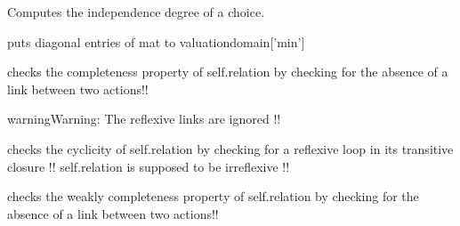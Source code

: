 \documentclass[letterpaper,10pt,english]{sphinxmanual}
\begin{document}
\begin{fulllineitems}
\begin{fulllineitems}
\end{fulllineitems}


\begin{fulllineitems}
\label{techDoc:digraphs.Digraph.intstab}
Computes the independence degree of a choice.

\end{fulllineitems}


\begin{fulllineitems}
\label{techDoc:digraphs.Digraph.irreflex}
puts diagonal entries of mat to valuationdomain{[}'min'{]}

\end{fulllineitems}


\begin{fulllineitems}
\label{techDoc:digraphs.Digraph.isComplete}
checks the completeness property of self.relation by checking
for the absence of a link between two actions!!

\begin{notice}{warning}{Warning:}
The reflexive links are ignored !!
\end{notice}

\end{fulllineitems}


\begin{fulllineitems}
\label{techDoc:digraphs.Digraph.isCyclic}
checks the cyclicity of self.relation by checking
for a reflexive loop in its transitive closure
!! self.relation is supposed to be irreflexive !!

\end{fulllineitems}


\begin{fulllineitems}
\label{techDoc:digraphs.Digraph.isWeaklyComplete}
checks the weakly completeness property of self.relation by checking
for the absence of a link between two actions!!


\end{fulllineitems}
\end{fulllineitems}
\end{document}

